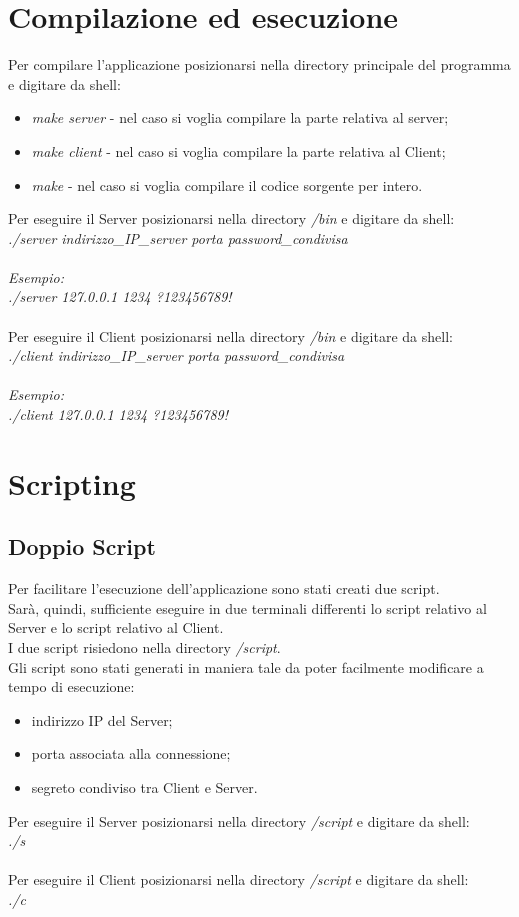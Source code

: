 \documentclass[12pt, a4paper]{article}
\begin{document}
\section{Compilazione ed esecuzione}
Per compilare l'applicazione posizionarsi nella directory principale del programma e digitare da shell:
\begin{itemize}
\item 
\textit{make server} - nel caso si voglia compilare la parte relativa al server;
\item 
\textit{make client} - nel caso si voglia compilare la parte relativa al Client;
\item 
\textit{make} - nel caso si voglia compilare il codice sorgente  per intero.
\end{itemize}
Per eseguire il Server posizionarsi nella directory \textit{/bin} e digitare da shell:\\
\textit{./server indirizzo\_IP\_server porta password\_condivisa}\\\\
\textit{Esempio:}\\
\textit{./server 127.0.0.1 1234 ?123456789!}\\\\
Per eseguire il Client posizionarsi nella directory \textit{/bin} e digitare da shell:\\
\textit{./client indirizzo\_IP\_server porta password\_condivisa}\\\\
\textit{Esempio:}\\
\textit{./client 127.0.0.1 1234 ?123456789!}
\newpage
\section{Scripting}
\subsection{Doppio Script}
Per facilitare l'esecuzione dell'applicazione sono stati creati due script.\\
Sarà, quindi, sufficiente eseguire in due terminali differenti lo script relativo al Server e lo script relativo al Client.\\
I due script risiedono nella directory \textit{/script}.\\
Gli script sono stati generati in maniera tale da poter facilmente modificare a tempo di esecuzione:
\begin{itemize}
\item
indirizzo IP del Server;
\item
porta associata alla connessione;
\item
segreto condiviso tra Client e Server.
\end{itemize}
Per eseguire il Server posizionarsi nella directory \textit{/script} e digitare da shell:\\
\textit{./s}\\\\
Per eseguire il Client posizionarsi nella directory \textit{/script} e digitare da shell:\\
\textit{./c}
\end{document}
